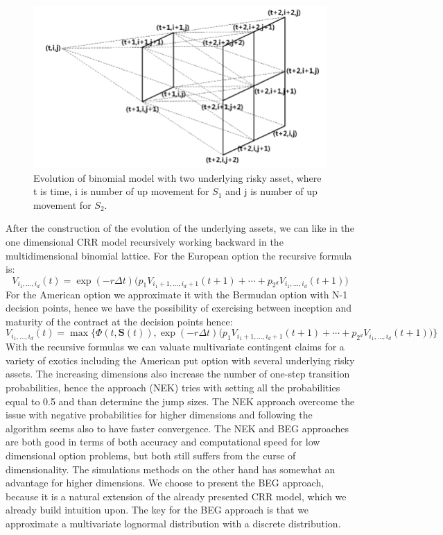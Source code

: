 \begin{figure}[th]
\centering
\includegraphics[width=\textwidth]{Figures/Three-dimensional-binomial-lattice.png}
\decoRule
\caption[Three Dimensional Binomial Lattice]{Evolution of binomial model with two underlying risky asset, where t is time, i is number of up movement for $S_1$ and j is number of up movement for $S_2$.}
\label{fig:threeDimLattice}
\end{figure}

After the construction of the evolution of the underlying assets, we can like in the one dimensional CRR model recursively working backward in the multidimensional binomial lattice. For the European option the recursive formula is:
$$V_{i_1,\ldots, i_d}(t)=\exp(-r\Delta t) \bigg(p_1 V_{i_1+1,\ldots, i_d +1}(t+1) + \cdots + p_{2^d} V_{i_1,\ldots, i_d}(t+1) \bigg)$$
For the American option we approximate it with the Bermudan option with N-1 decision points, hence we have the possibility of exercising between inception and maturity of the contract at the decision points hence:
$$V_{i_1,\ldots, i_d}(t)=\max\{\Phi(t,\bm{S}(t)), \exp(-r\Delta t) \bigg(p_1 V_{i_1+1,\ldots, i_d +1}(t+1) + \cdots + p_{2^d} V_{i_1,\ldots, i_d}(t+1) \bigg)\}$$
With the recursive formulas we can valuate multivariate contingent claims for a variety of exotics including the American put option with several underlying risky assets. The increasing dimensions also increase the number of one-step transition probabilities, hence the \parencite{NEK} approach (NEK) tries with setting all the probabilities equal to 0.5 and than determine the jump sizes. The NEK approach overcome the issue with negative probabilities for higher dimensions and following \parencite{NEK} the algorithm seems also to have faster convergence. The NEK and BEG approaches are both good in terms of both accuracy and computational speed for low dimensional option problems, but both still suffers from the curse of dimensionality. The simulations methods on the other hand has somewhat an advantage for higher dimensions. We choose to present the BEG approach, because it is a natural extension of the already presented CRR model, which we already build intuition upon. The key for the BEG approach is that we approximate a multivariate lognormal distribution with a discrete distribution. 

